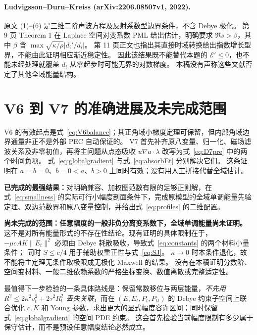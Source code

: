 \documentclass[UTF8,a4paper,11pt,fontset=none]{ctexart}
\numberwithin{equation}{section}
\theoremstyle{definition}
\theoremstyle{definition}
\newcommand{\Ecal}{\mathcal E}
\begin{document}
\paragraph{Ludvigsson--Duru--Kreiss (arXiv:2206.08507v1, 2022).}
原文 (1)--(6) 是三维二阶声波方程及反射系数型边界条件，不含 Debye 极化。
第 9 页 Theorem 1 在 Laplace 空间对变系数 PML 给出估计，明确要求
$\Re s>\beta$，其中 $\beta$ 含 $\max\sqrt{\kappa/\rho}|d_i'/d_i|$。
第 11 页正文也指出其直接时域转换给出指数增长型界，不能由此证明相应渐近稳定性。
因此该结果既不能替代本题的 $\Ecal'\le0$，也不能未经处理就覆盖 $d_i$ 从零起步时可能无界的对数梯度\cite{ludvigsson2022}。
本稿没有声称这些文献否定了其他全域能量结构。

\section{V6 到 V7 的准确进展及未完成范围}
\label{sec:conclusion}

V6 的有效起点是式~\eqref{eq:V6balance}；其正角域小梯度定理可保留，但内部角域边界通量非正不是外部 PEC 自动保证的。
V7 首先补齐原八变量、归一化、磁场滤波关系及非零初值，再将主问题从点态吸收 $u\nabla a\cdot\lambda$ 改写为式~\eqref{eq:D7pre} 中的两个时间负项。
式~\eqref{eq:globalgradient} 与式~\eqref{eq:absorbEt} 分别解决它们。
这条证明在 $a=b=0$、$b=0<a$、$b>0$ 上同时有效；没有用人工拼接代替全域估计。

\textbf{已完成的最强结果：}对明确兼容、加权图范数有限的足够正则解，在式~\eqref{eq:smallness} 的实际可行小幅度剖面条件下，完成原模型的全域单调能量先验定理、双边范数界和原八变量控制，并给出式~\eqref{eq:profiles} 的二维配置。

\textbf{尚未完成的范围：任意幅度的一般非负分离变系数下，全域单调能量尚未证明。}
这不是对所有能量形式的不存在性结论。现有证明的具体限制在于，
$-\mu cAK\|E_t\|^2$ 必须由 Debye 耗散吸收，导致式~\eqref{eq:constants} 的两个材料小量条件；
同时 $S\le c/4$ 用于辅助权重正性与式~\eqref{eq:SJ}。
$\kappa\to0$ 时本条件退化，故不能将主定理无条件取极限成无极化 Maxwell 的结果。
没有在本稿证明分数阶、空间变材料、一般二维依赖系数的严格坐标变换、数值离散或完整适定性。

最值得下一步检验的一条具体路线是：保留常数移位与两层能量，\emph{不先用 $R^2\le2\kappa^2v_t^2+2\tau^2R_t^2$ 丢失关联}，而在
$(E,E_t,P_t,P_{tt})$ 的 Debye 约束子空间上联合优化 $c,K$ 和 Young 参数，求出更大的显式幅度容许区间；同时保留式~\eqref{eq:globalgradient} 的空间 PDE 约束。
这会首先检验当前幅度限制有多少属于保守估计，而不是预设任意幅度结论必然成立。

\appendix
\end{document}
